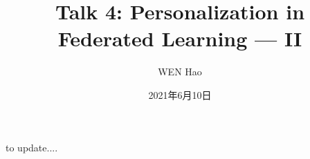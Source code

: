 

\title{Talk 4: Personalization in Federated Learning --- II}
\date{2021年6月10日}
\author{WEN Hao}

\maketitle

to update....





